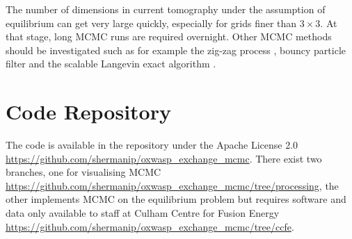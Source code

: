 \documentclass[10pt]{proc}
\begin{document}
The number of dimensions in current tomography under the assumption of equilibrium can get very large quickly, especially for grids finer than $3\times 3$. At that stage, long MCMC runs are required overnight. Other MCMC methods should be investigated such as for example the zig-zag process \citep{bierkens2016zig}, bouncy particle filter \citep{bouchard2018bouncy} and the scalable Langevin exact algorithm \citep{pollock2016scalable}.

\section{Code Repository}
The code is available in the repository under the Apache License 2.0 \url{https://github.com/shermanip/oxwasp_exchange_mcmc}. There exist two branches, one for visualising MCMC \url{https://github.com/shermanip/oxwasp_exchange_mcmc/tree/processing}, the other implements MCMC on the equilibrium problem but requires software and data only available to staff at Culham Centre for Fusion Energy \url{https://github.com/shermanip/oxwasp_exchange_mcmc/tree/ccfe}.



\end{document}
